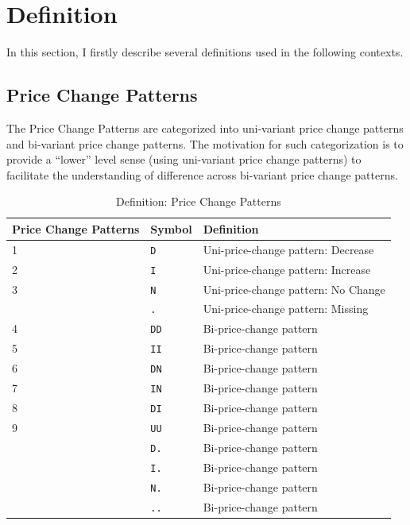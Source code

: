 

\clearpage
\tableofcontents

\clearpage
\section{Definition}

In this section, I firstly describe several definitions used in the following contexts.

\subsection{Price Change Patterns}

The Price Change Patterns are categorized into uni-variant price change patterns and bi-variant price change patterns. The motivation for such categorization is to provide a ``lower'' level sense (using uni-variant price change patterns) to facilitate the understanding of difference across bi-variant price change patterns.

\begin{table}[H]
	\caption{Definition: Price Change Patterns}
	\begin{tabular}{lll}
		\hline\hline
		Price Change Patterns &   Symbol    & Definition                          \\ \hline\hline
		1                     & \texttt{D } & Uni-price-change pattern: Decrease  \\
		2                     & \texttt{I } & Uni-price-change pattern: Increase  \\
		3                     & \texttt{N } & Uni-price-change pattern: No Change \\ \hline
		& \texttt{. } & Uni-price-change pattern: Missing   \\ \hline\hline
		4                     & \texttt{DD} & Bi-price-change pattern             \\
		5                     & \texttt{II} & Bi-price-change pattern             \\
		6                     & \texttt{DN} & Bi-price-change pattern             \\
		7                     & \texttt{IN} & Bi-price-change pattern             \\
		8                     & \texttt{DI} & Bi-price-change pattern             \\
		9                     & \texttt{UU} & Bi-price-change pattern             \\ \hline
		& \texttt{D.} & Bi-price-change pattern             \\
		& \texttt{I.} & Bi-price-change pattern             \\
		& \texttt{N.} & Bi-price-change pattern             \\
		& \texttt{..} & Bi-price-change pattern             \\ \hline\hline
	\end{tabular}
\end{table}

